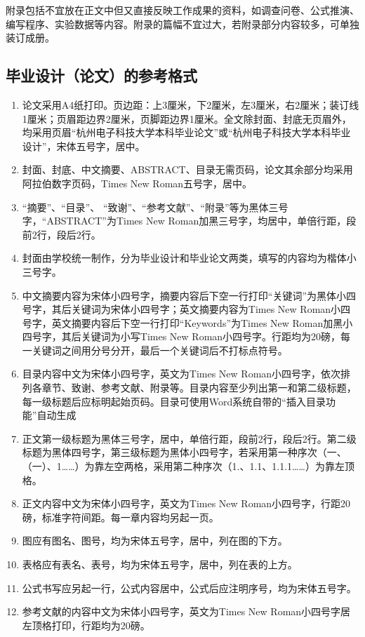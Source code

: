 \documentclass{HDU-Bachelor-Thesis}
\begin{document}
附录包括不宜放在正文中但又直接反映工作成果的资料，如调查问卷、公式推演、编写程序、实验数据等内容。附录的篇幅不宜过大，若附录部分内容较多，可单独装订成册。

\subsection{毕业设计（论文）的参考格式}

\begin{enumerate}
    \item 论文采用A4纸打印。页边距：上3厘米，下2厘米，左3厘米，右2厘米；装订线1厘米；页眉距边界2厘米，页脚距边界1厘米。全文除封面、封底无页眉外，均采用页眉“杭州电子科技大学本科毕业论文”或“杭州电子科技大学本科毕业设计”，宋体五号字，居中。

    \item 封面、封底、中文摘要、ABSTRACT、目录无需页码，论文其余部分均采用阿拉伯数字页码，Times New Roman五号字，居中。

    \item “摘要”、“目录”、 “致谢”、“参考文献”、“附录”等为黑体三号字，“ABSTRACT”为Times New Roman加黑三号字，均居中，单倍行距，段前2行，段后2行。

    \item 封面由学校统一制作，分为毕业设计和毕业论文两类，填写的内容均为楷体小三号字。

    \item 中文摘要内容为宋体小四号字，摘要内容后下空一行打印“关键词”为黑体小四号字，其后关键词为宋体小四号字；英文摘要内容为Times New Roman小四号字，英文摘要内容后下空一行打印“Keywords”为Times New Roman加黑小四号字，其后关键词为小写Times New Roman小四号字。行距均为20磅，每一关键词之间用分号分开，最后一个关键词后不打标点符号。

    \item 目录内容中文为宋体小四号字，英文为Times New Roman小四号字，依次排列各章节、致谢、参考文献、附录等。目录内容至少列出第一和第二级标题，每一级标题后应标明起始页码。目录可使用Word系统自带的“插入目录功能”自动生成

    \item 正文第一级标题为黑体三号字，居中，单倍行距，段前2行，段后2行。第二级标题为黑体四号字，第三级标题为黑体小四号字，若采用第一种序次（一、（一）、1……）为靠左空两格，采用第二种序次（1.、1.1、1.1.1……）为靠左顶格。

    \item 正文内容中文为宋体小四号字，英文为Times New Roman小四号字，行距20磅，标准字符间距。每一章内容均另起一页。

    \item  图应有图名、图号，均为宋体五号字，居中，列在图的下方。

    \item 表格应有表名、表号，均为宋体五号字，居中，列在表的上方。

    \item 公式书写应另起一行，公式内容居中，公式后应注明序号，均为宋体五号字。

    \item 参考文献的内容中文为宋体小四号字，英文为Times New Roman小四号字居左顶格打印，行距均为20磅。
\end{enumerate}
\end{document}
